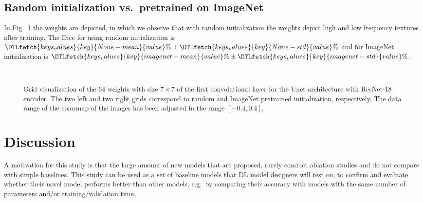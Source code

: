 \documentclass[journal]{IEEEtran}
\begin{document}
\subsection{Random initialization vs.\ pretrained on ImageNet}
In Fig.~\ref{fig:weights} the weights are depicted, in which we observe that with random initialization the weights depict high and low frequency textures after training.
The Dice for using random initialization is $\DTLfetch{keys_values}{key}{None-mean}{value}\%\pm\DTLfetch{keys_values}{key}{None-std}{value}\%$ and for ImageNet initialization is $\DTLfetch{keys_values}{key}{imagenet-mean}{value}\%\pm\DTLfetch{keys_values}{key}{imagenet-std}{value}\%$.

\begin{figure}[!t]
	\\
	\setcounter{subfigure}{0}
	\caption{Grid visualization of the $64$ weights with size $7\times 7$ of the first convolutional layer for the Unet architecture with ResNet-18 encoder.
	The two left and two right grids correspond to random and ImageNet pretrained initialization, respectively.
	The data range of the colormap of the images has been adjusted in the range $[-0.4, 0.4]$.}
	\label{fig:weights}
\end{figure}

\section{Discussion}
\label{sec:discussion}
A motivation for this study is that the large amount of new models that are proposed, rarely conduct ablation studies and do not compare with simple baselines.
This study can be used as a set of baseline models that DL model designers will test on, to confirm and evaluate whether their novel model performs better than other models, e.g.\ by comparing their accuracy with models with the same number of parameters and/or training/validation time.
\end{document}
